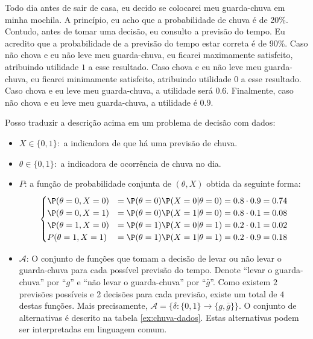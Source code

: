 \begin{example}
 \label{ex:guarda-chuva-dados}
 Todo dia antes de sair de casa,
 eu decido se colocarei meu guarda-chuva em minha mochila.
 A princípio, eu acho que a
 probabilidade de chuva é de 20\%.
 Contudo, antes de tomar uma decisão,
 eu consulto a previsão do tempo.
 Eu acredito que a probabilidade de a
 previsão do tempo estar correta é de 90\%.
 Caso não chova e eu não leve meu guarda-chuva,
 eu ficarei maximamente satisfeito, 
 atribuindo utilidade $1$ a esse resultado.
 Caso chova e eu não leve meu guarda-chuva,
 eu ficarei minimamente satisfeito, 
 atribuindo utilidade $0$ a esse resultado.
 Caso chova e eu leve meu guarda-chuva, 
 a utilidade será $0.6$.
 Finalmente, caso não chova e 
 eu leve meu guarda-chuva, 
 a utilidade é $0.9$.

 Posso traduzir a descrição acima em 
 um problema de decisão com dados:
 \begin{itemize}
  \item $X \in \{0,1\}:$ 
  a indicadora de que há uma previsão de chuva.
  \item $\theta \in \{0,1\}:$ 
  a indicadora de ocorrência de chuva no dia.
  \item $P$: a função de probabilidade conjunta de
  $(\theta,X)$ obtida da seguinte forma:
  \begin{align*}
   \begin{cases}
    \P(\theta=0,X=0)	
    &= \P(\theta=0)\P(X=0|\theta=0)
    = 0.8 \cdot 0.9 = 0.74 \\
	\P(\theta=0,X=1)	
    &= \P(\theta=0)\P(X=1|\theta=0) 
    = 0.8 \cdot 0.1 = 0.08 \\
	\P(\theta=1,X=0)	
    &= \P(\theta=1)\P(X=0|\theta=1) 
    = 0.2 \cdot 0.1 = 0.02 \\
	P(\theta=1,X=1)	
    &= \P(\theta=1)\P(X=1|\theta=1) 
    = 0.2 \cdot 0.9 = 0.18
   \end{cases}
  \end{align*}
  \item $\mathcal{A}$: 
  O conjunto de funções que 
  tomam a decisão de levar ou 
  não levar o guarda-chuva para
  cada possível previsão do tempo.
  Denote ``levar o guarda-chuva'' por ``$g$'' e
  ``não levar o guarda-chuva'' por ``$\bar{g}$''.
  Como existem $2$ previsões possíveis e 
  2 decisões para cada previsão,
  existe um total de $4$ destas funções.
  Mais precisamente, $\mathcal{A} = \{\delta: \{0,1\} \rightarrow \{g,\bar{g}\}\}$.
  O conjunto de alternativas é descrito 
  na tabela \ref{ex:chuva-dados}.
  Estas alternativas podem ser interpretadas 
  em linguagem comum.
										

\end{itemize}
\end{example}
